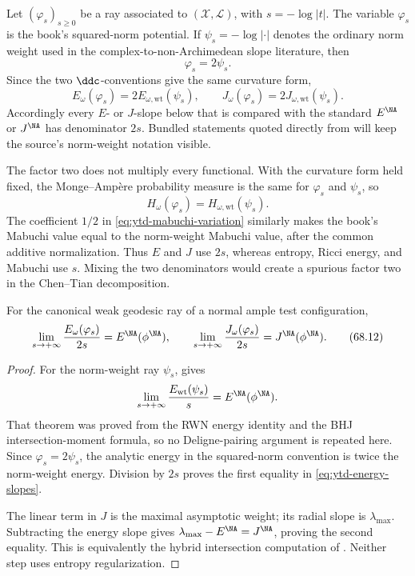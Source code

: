 Let $(\varphi_s)_{s\geq0}$ be a ray associated to
$(\mathcal X,\mathcal L)$, with $s=-\log|t|$.
The variable $\varphi_s$ is the book's squared-norm potential.  If
$\psi_s=-\log|\cdot|$ denotes the ordinary norm weight used in the
complex-to-non-Archimedean slope literature, then
\[
                         \varphi_s=2\psi_s.
\]
Since the two $\ddc$-conventions give the same curvature form,
\[
 E_\omega(\varphi_s)=2E_{\omega,\mathrm{wt}}(\psi_s),
 \qquad
 J_\omega(\varphi_s)=2J_{\omega,\mathrm{wt}}(\psi_s).
\]
Accordingly every $E$- or $J$-slope below that is compared with the
standard $E^{\NA}$ or $J^{\NA}$ has denominator $2s$.  Bundled
statements quoted directly from \cite{BHJ19} will keep the source's
norm-weight notation visible.

The factor two does not multiply every functional. With the curvature form
held fixed, the Monge--Amp\`ere probability measure is the same for
$\varphi_s$ and $\psi_s$, so
\[
 H_\omega(\varphi_s)=H_{\omega,\mathrm{wt}}(\psi_s).
\]
The coefficient $1/2$ in \eqref{eq:ytd-mabuchi-variation} similarly makes
the book's Mabuchi value equal to the norm-weight Mabuchi value, after the
common additive normalization. Thus $E$ and $J$ use $2s$, whereas
entropy, Ricci energy, and Mabuchi use $s$. Mixing the two denominators
would create a spurious factor two in the Chen--Tian decomposition.

\begin{theorem}\label{thm:ytd-energy-slopes}
For the canonical weak geodesic ray of a normal ample test
configuration,
\[
 \lim_{s\to+\infty}\frac{E_\omega(\varphi_s)}{2s}
       =E^{\NA}(\phi^{\NA}),
 \qquad
 \lim_{s\to+\infty}\frac{J_\omega(\varphi_s)}{2s}
       =J^{\NA}(\phi^{\NA}).
\tag{68.12}\label{eq:ytd-energy-slopes}
\]
\end{theorem}

\begin{proof}
For the norm-weight ray $\psi_s$,
 gives
\[
       \lim_{s\to+\infty}\frac{E_{\mathrm{wt}}(\psi_s)}s
          =E^{\NA}(\phi^{\NA}).
\]
That theorem was proved from the RWN energy identity and the BHJ
intersection-moment formula, so no Deligne-pairing argument is repeated
here. Since $\varphi_s=2\psi_s$, the analytic energy in the squared-norm
convention is twice the norm-weight energy. Division by $2s$ proves the
first equality in \eqref{eq:ytd-energy-slopes}.

The linear term in $J$ is the maximal asymptotic weight; its radial slope
is $\lambda_{\max}$. Subtracting the energy slope gives
$\lambda_{\max}-E^{\NA}=J^{\NA}$, proving the second equality. This is
equivalently the hybrid intersection computation of
. Neither step uses entropy regularization.
\end{proof}

